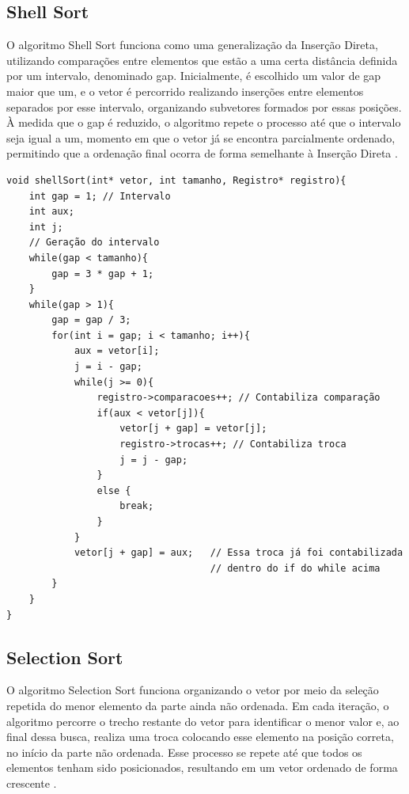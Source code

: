 \documentclass[12pt]{article}
\begin{document}
\subsection{Shell Sort}

O algoritmo Shell Sort funciona como uma generalização da Inserção Direta, utilizando comparações entre elementos que estão a uma certa distância definida por um intervalo, denominado gap. Inicialmente, é escolhido um valor de gap maior que um, e o vetor é percorrido realizando inserções entre elementos separados por esse intervalo, organizando subvetores formados por essas posições. À medida que o gap é reduzido, o algoritmo repete o processo até que o intervalo seja igual a um, momento em que o vetor já se encontra parcialmente ordenado, permitindo que a ordenação final ocorra de forma semelhante à Inserção Direta \cite{ziviani2012}.

\newpage

\begin{lstlisting}
void shellSort(int* vetor, int tamanho, Registro* registro){
    int gap = 1; // Intervalo 
    int aux;
    int j;
    // Geração do intervalo
    while(gap < tamanho){
        gap = 3 * gap + 1;
    }
    while(gap > 1){
        gap = gap / 3;
        for(int i = gap; i < tamanho; i++){
            aux = vetor[i];
            j = i - gap;
            while(j >= 0){		
                registro->comparacoes++; // Contabiliza comparação
                if(aux < vetor[j]){
                    vetor[j + gap] = vetor[j];
                    registro->trocas++; // Contabiliza troca
                    j = j - gap;
                }
                else {
                    break;
                }	
            }
            vetor[j + gap] = aux;   // Essa troca já foi contabilizada 
                                    // dentro do if do while acima	
        }
    }
}
\end{lstlisting}

\subsection{Selection Sort}

O algoritmo Selection Sort funciona organizando o vetor por meio da seleção repetida do menor elemento da parte ainda não ordenada. Em cada iteração, o algoritmo percorre o trecho restante do vetor para identificar o menor valor e, ao final dessa busca, realiza uma troca colocando esse elemento na posição correta, no início da parte não ordenada. Esse processo se repete até que todos os elementos tenham sido posicionados, resultando em um vetor ordenado de forma crescente \cite{ziviani2012}.
\end{document}
